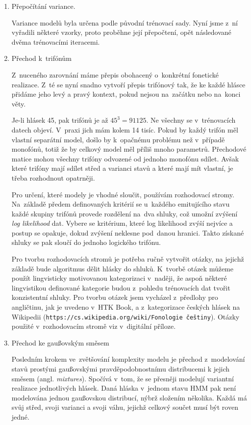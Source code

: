\begin{enumerate}
\item{Přepočítání variance.}

Variance modelů byla určena podle původní trénovací sady. Nyní jsme z~ní
vyřadili některé vzorky, proto proběhne její přepočtení, opět následované dvěma
trénovacími iteracemi.

\item{Přechod k~trifónům}
\label{item:htktrain:triphones}

Z~nuceného zarovnání máme přepis obohacený o~konkrétní fonetické realizace. Z~té
se nyní snadno vytvoří přepis trifónový tak, že ke každé hlásce přidáme
jeho levý a pravý kontext, pokud nejsou na~začátku nebo na~konci věty.

Je-li hlásek 45, pak trifónů je až $45^3 = 91125$. Ne všechny se v~trénovacích
datech objeví. V~praxi jich mám kolem 14 tisíc. Pokud by každý trifón měl
vlastní separátní model, došlo by k~opačnému problému než v~případě monofónů,
totiž že by celkový model měl příliš mnoho parametrů. Přechodové matice mohou
všechny trifóny odvozené od jednoho monofónu sdílet. Avšak které trifóny
mají sdílet střed a varianci stavů a které mají mít vlastní, je třeba rozhodnout opatrněji.

Pro určení, které modely je vhodné sloučit, používám rozhodovací stromy.
Na~základě předem definovaných kritérií se u~každého emitujícího stavu každé
skupiny trifónů provede rozdělení na~dva shluky, což umožní zvýšení
\textit{log likelihood} dat. Vybere se kritérium, které log likelihood
zvýší nejvíce a postup se opakuje, dokud zvýšení neklesne pod~danou hranici.
Takto získané shluky se pak sloučí do jednoho logického trifónu.

Pro tvorbu rozhodovacích stromů je potřeba ručně vytvořit
otázky, na jejichž základě bude algoritmus dělit hlásky do shluků. K~tvorbě
otázek můžeme použít lingvisticky motivovanou kategorizaci v~naději, že aspoň
některé lingvistikou definované kategorie budou z~pohledu trénovacích dat tvořit
konzistentní shluky. Pro tvorbu otázek jsem vycházel z~předlohy pro
angličtinu, jak je uvedeno v~HTK Book, a z~kategorizace českých hlásek na Wikipedii
(\texttt{https://cs.wikipedia.org/wiki/Fonologie~češtiny}).
Otázky použité v~rozhodovacím stromě viz v~digitální příloze.

\item{Přechod ke gaußovským směsem}

Posledním krokem ve~zvětšování komplexity modelu je přechod z~modelování stavů
prostými gaußovskými pravděpodobnostnímu distribucemi k jejich směsem
(angl. \textit{mixtures}). Spočívá v~tom, že se přesněji modelují variantní
realizace jednotlivých hlásek. Daná hláska v~jednom stavu HMM pak není modelována jednou gaußovskou
distribucí, nýbrž složením několika. Každá má svůj střed, svoji varianci a svoji
váhu, jejichž celkový součet musí být roven jedné.


\end{enumerate}

